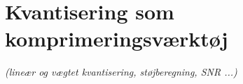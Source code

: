 \newpage
\section{Kvantisering som komprimeringsværktøj}
\textit{(lineær og vægtet kvantisering, støjberegning, SNR ...)}
